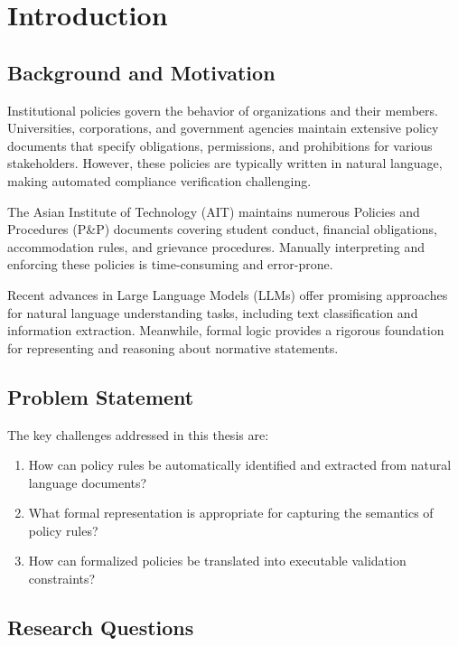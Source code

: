 \chapter{Introduction}
\label{ch:introduction}

\section{Background and Motivation}

Institutional policies govern the behavior of organizations and their members. Universities, corporations, and government agencies maintain extensive policy documents that specify obligations, permissions, and prohibitions for various stakeholders. However, these policies are typically written in natural language, making automated compliance verification challenging.

The Asian Institute of Technology (AIT) maintains numerous Policies and Procedures (P\&P) documents covering student conduct, financial obligations, accommodation rules, and grievance procedures. Manually interpreting and enforcing these policies is time-consuming and error-prone.

Recent advances in Large Language Models (LLMs) offer promising approaches for natural language understanding tasks, including text classification and information extraction. Meanwhile, formal logic provides a rigorous foundation for representing and reasoning about normative statements.

\section{Problem Statement}

The key challenges addressed in this thesis are:

\begin{enumerate}
    \item How can policy rules be automatically identified and extracted from natural language documents?
    \item What formal representation is appropriate for capturing the semantics of policy rules?
    \item How can formalized policies be translated into executable validation constraints?
\end{enumerate}

\section{Research Questions}

